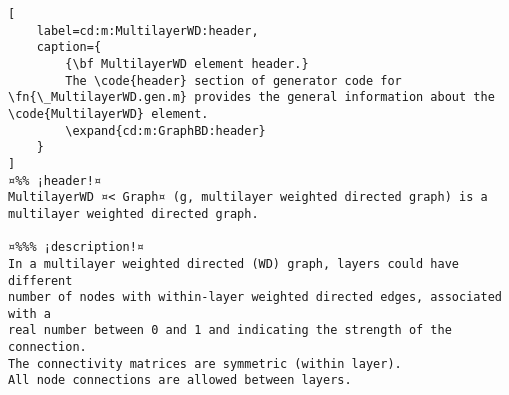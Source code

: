\documentclass{tufte-handout}
\begin{document}
\begin{lstlisting}[
	label=cd:m:MultilayerWD:header,
	caption={
		{\bf MultilayerWD element header.}
		The \code{header} section of generator code for \fn{\_MultilayerWD.gen.m} provides the general information about the \code{MultilayerWD} element.
		\expand{cd:m:GraphBD:header}
	}
]
¤%% ¡header!¤
MultilayerWD ¤< Graph¤ (g, multilayer weighted directed graph) is a multilayer weighted directed graph.

¤%%% ¡description!¤
In a multilayer weighted directed (WD) graph, layers could have different
number of nodes with within-layer weighted directed edges, associated with a
real number between 0 and 1 and indicating the strength of the connection.
The connectivity matrices are symmetric (within layer).
All node connections are allowed between layers.
\end{lstlisting}
\end{document}
